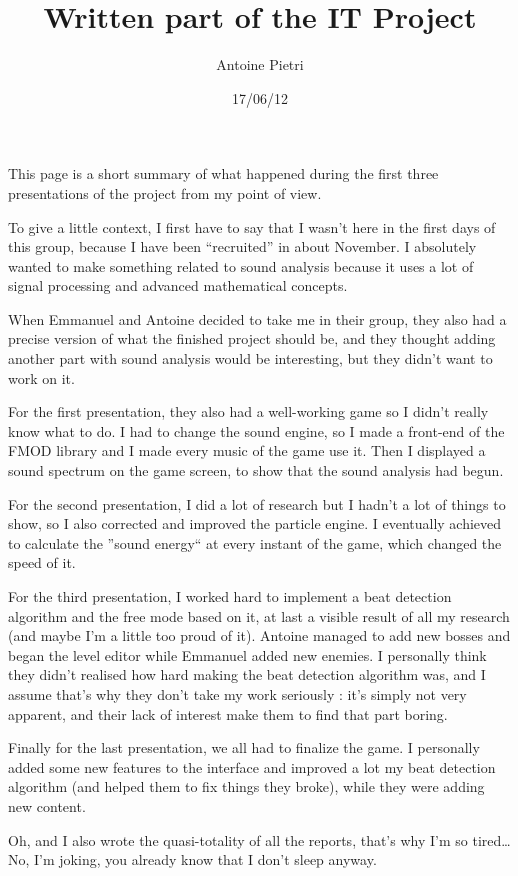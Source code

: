 \documentclass[10pt,a4paper]{article}
\title{Written part of the IT Project}
\author{Antoine Pietri}
\date{17/06/12}
\begin{document}
\maketitle
	\par This page is a short summary of what happened during the first three presentations
	of the project from my point of view.
	\par To give a little context, I first have to say that I wasn't here in the first days of this group, because I have been ``recruited'' in about November. I absolutely wanted to make something related to sound analysis because it uses a lot of signal processing and advanced mathematical concepts.
	\par When Emmanuel and Antoine decided to take me in their group, they also had
	a precise version of what the finished project should be, and they thought adding another part with sound analysis would be interesting, but they didn't want to work on it.
	\par For the first presentation, they also had a well-working game so I didn't really know what to do. I had to change the sound engine, so I made a front-end of the FMOD library and I made every music of the game use it. Then I displayed a sound spectrum on the game screen, to show that the sound analysis had begun.
	\par For the second presentation, I did a lot of research but I hadn't a lot of things to show, so I also corrected and improved the particle engine. I eventually achieved to calculate the ''sound energy`` at every instant of the game, which changed the speed of it.
	\par For the third presentation, I worked hard to implement a beat detection algorithm and the free mode based on it, at last a visible result of all my research (and maybe I'm a little too proud of it). Antoine managed to add new bosses and began the level editor while Emmanuel added new enemies. I personally think they didn't realised how hard making the beat detection algorithm was, and I assume that's why they don't take my work seriously : it's simply not very apparent, and their lack of interest make them to find that part boring.
	\par Finally for the last presentation, we all had to finalize the game. I personally added some new features to the interface and improved a lot my beat detection algorithm (and helped them to fix things they broke), while they were adding new content.
	\par Oh, and I also wrote the quasi-totality of all the reports, that's why I'm so tired\ldots No, I'm joking, you already know that I don't sleep anyway.
\end{document}
